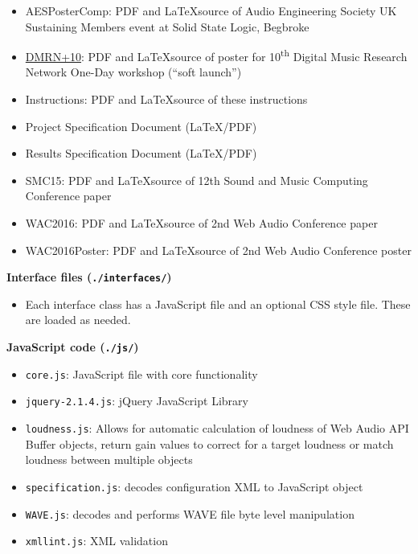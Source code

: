 \documentclass[11pt, oneside]{article}   	%
\begin{document}
	        \begin{itemize}
         		\item AESPosterComp: PDF and \LaTeX  source of Audio Engineering Society UK Sustaining Members event at Solid State Logic, Begbroke
         		\item \href{http://c4dm.eecs.qmul.ac.uk/dmrn/events/dmrnp10/#posters}{DMRN+10}: PDF and \LaTeX source of poster for 10\textsuperscript{th} Digital Music Research Network One-Day workshop (``soft launch'')
         		\item Instructions: PDF and \LaTeX source of these instructions
            	\item Project Specification Document (\LaTeX/PDF)
            	\item Results Specification Document (\LaTeX/PDF)
            	\item SMC15: PDF and \LaTeX  source of 12th Sound and Music Computing Conference paper \cite{waet}
            	\item WAC2016: PDF and \LaTeX  source of 2nd Web Audio Conference paper \cite{waetwac}
            	\item WAC2016Poster: PDF and \LaTeX  source of 2nd Web Audio Conference poster\\
			\end{itemize}
        \textbf{Interface files (\texttt{./interfaces/})}
          	\begin{itemize}
              	\item Each interface class has a JavaScript file and an optional CSS style file. These are loaded as needed.
          	\end{itemize}
        \textbf{JavaScript code (\texttt{./js/})}
          	\begin{itemize}
              	\item \texttt{core.js}: JavaScript file with core functionality
              	\item \texttt{jquery-2.1.4.js}: jQuery JavaScript Library
				\item \texttt{loudness.js}: Allows for automatic calculation of loudness of Web Audio API Buffer objects, return gain values to correct for a target loudness or match loudness between multiple objects
				\item \texttt{specification.js}: decodes configuration XML to JavaScript object
				\item \texttt{WAVE.js}: decodes and performs WAVE file byte level manipulation
              	\item \texttt{xmllint.js}: XML validation
          	\end{itemize}
\end{document}
